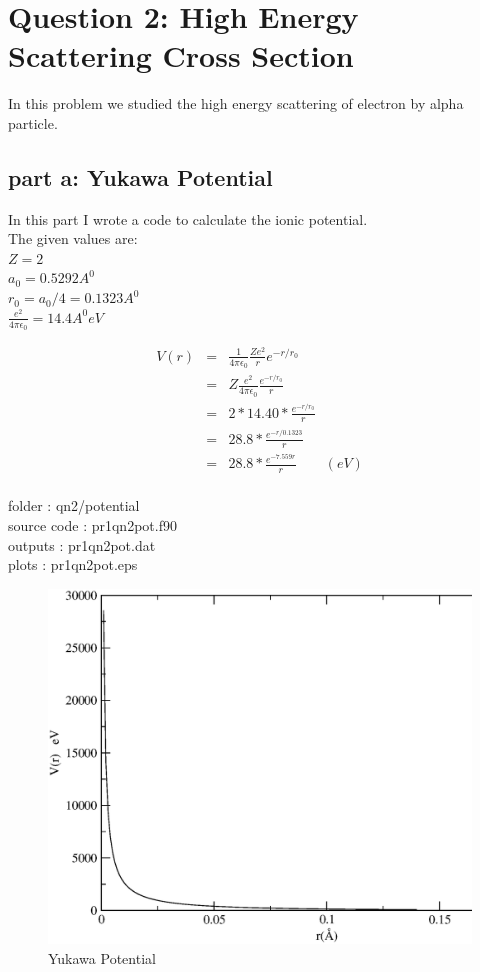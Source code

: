 \documentclass[11pt,a4paper,english]{article}
\newcommand{\no}{\nonumber}
\newcommand{\beqa}{\begin{eqnarray}}
\newcommand{\eeqa}{\end{eqnarray}}
\begin{document}
\clearpage	
\section{Question 2: High Energy Scattering Cross Section}
In this problem we studied the high energy scattering of electron by alpha particle.

	
	\subsection{part a: Yukawa Potential}
In this part I wrote a code to calculate the ionic potential.\\
The given values are:\\
$ Z=2 $\\
$ a_{0} = 0.5292 A^{0} $\\
$ r_{0}= a_{0}/4 = 0.1323 A^{0}$\\
$ \frac{e^{2}}{4\pi\epsilon_{0}} = 14.4 A^{0} eV $

	\beqa
	V(r) &=& \frac{1}{4\pi\epsilon_{0}} \frac{Ze^{2}}{r} e^{-r/r_{0}} \\
	 &=& Z \frac{e^{2}}{4\pi\epsilon_{0}} \frac{ e^{-r/r_{0}}}{r} \no\\
	 &=& 2 * 14.40 * \frac{ e^{-r/r_{0}}}{r}  \no\\
	 &=& 28.8 * \frac{ e^{-r/0.1323}}{r}  \no\\
	 &=& 28.8 * \frac{ e^{-7.559r}}{r} \quad\quad (eV) \no\\
	\eeqa

    folder       : qn2/potential\\
	source code  : pr1qn2pot.f90\\
	outputs      : pr1qn2pot.dat\\
	plots        : pr1qn2pot.eps\\
	
	
	\begin{figure}[h!]
	\centering
	\includegraphics [scale=0.6]{pr1qn2pot.eps}
	\caption{Yukawa Potential }
	\end{figure}
	\clearpage
	
\end{document}
